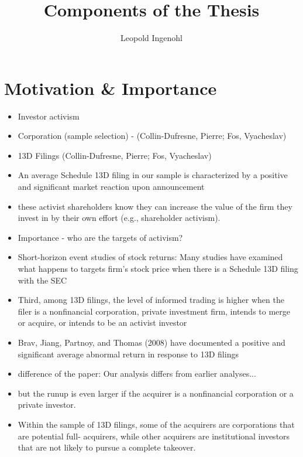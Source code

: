 \documentclass[12pt]{article}
\title{Components of the Thesis}
\author{Leopold Ingenohl}
\begin{document}
\maketitle


\section{Motivation \& Importance} 

    \begin{itemize}
        \item Investor activism 
        \item Corporation (sample selection) - (Collin-Dufresne, Pierre; Fos, Vyacheslav)
        \item 13D Filings (Collin-Dufresne, Pierre; Fos, Vyacheslav)
        \item An average Schedule 13D filing in our sample is characterized by a positive and significant market reaction upon announcement \citet{Collin-Dufresne2015}
        \item these activist shareholders know they can increase the value of the firm they invest in by their own effort (e.g., shareholder activism).\citet{Collin-Dufresne2015}
        \item Importance - who are the targets of activism? \citet{CoffeeJr.2014}
        \item Short-horizon event studies of stock returns: Many studies have examined what happens to targets firm’s stock price when there is a Schedule 13D filing with the SEC \citet{CoffeeJr.2014}
        \item Third, among 13D filings, the level of informed trading is higher when the filer is a nonfinancial corporation, private investment firm, intends to merge or acquire, or intends to be an activist investor \citet{Brigida2012}
        \item Brav, Jiang, Partnoy, and Thomas (2008) have documented a positive and significant average abnormal return in response to 13D filings \citet{Brigida2012}
        \item difference of the paper: Our analysis differs from earlier analyses...\citet{Brigida2012}
        \item but the runup is even larger if the acquirer is a nonfinancial corporation or a private investor.\citet{Brigida2012}
        \item Within the sample of 13D filings, some of the acquirers are corporations that are potential full-
        acquirers, while other acquirers are institutional investors that are not likely to pursue a complete takeover. \citet{Brigida2012}

\end{itemize}
\end{document}
